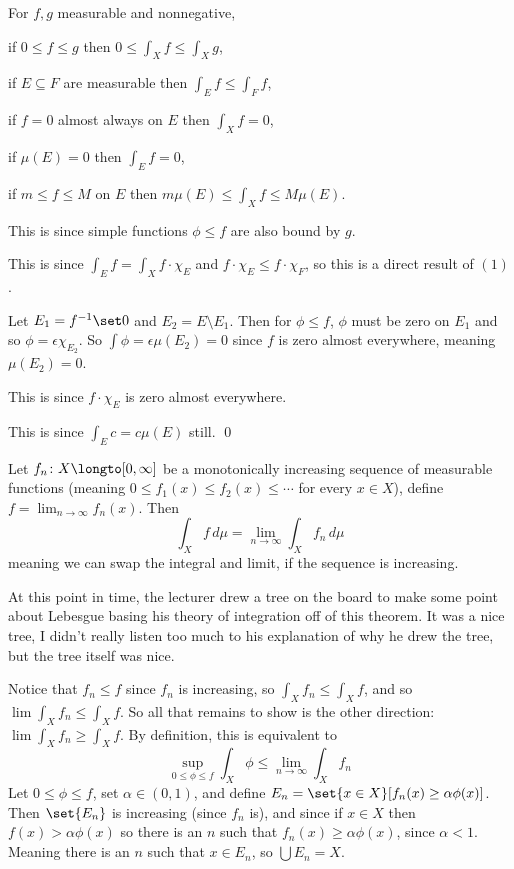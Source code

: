 \bthrm

    For $f,g$ measurable and nonnegative,
    \benum
        \item if $0\leq f\leq g$ then $0\leq\int_Xf\leq\int_Xg$,
        \item if $E\subseteq F$ are measurable then $\int_Ef\leq\int_Ff$,
        \item if $f=0$ almost always on $E$ then $\int_Xf=0$,
        \item if $\mu(E)=0$ then $\int_Ef=0$,
        \item if $m\leq f\leq M$ on $E$ then $m\mu(E)\leq\int_Xf\leq M\mu(E)$.
    \eenum

\ethrm

\Proof\benum
    \item This is since simple functions $\phi\leq f$ are also bound by $g$.
    \item This is since $\int_Ef=\int_Xf\cdot\chi_E$ and $f\cdot\chi_E\leq f\cdot\chi_F$, so this is a direct result of $(1)$.
    \item Let $E_1=f^{-1}\set0$ and $E_2=E\setminus E_1$.
        Then for $\phi\leq f$, $\phi$ must be zero on $E_1$ and so $\phi=\epsilon\chi_{E_2}$.
        So $\int\phi=\epsilon\mu(E_2)=0$ since $f$ is zero almost everywhere, meaning $\mu(E_2)=0$.
    \item This is since $f\cdot\chi_E$ is zero almost everywhere.
    \item This is since $\int_Ec=c\mu(E)$ still.
        \qed
\eenum

\bthrm[title=The Monotone Convergence Theorem, name=monothrm]

    Let $f_n\colon X\longto[0,\infty]$ be a monotonically increasing sequence of measurable functions (meaning $0\leq f_1(x)\leq f_2(x)\leq\cdots$ for every $x\in X$), define $f=\lim_{n\to\infty}f_n(x)$.
    Then
    $$ \int_Xf\,d\mu = \lim_{n\to\infty}\int_Xf_n\,d\mu $$
    meaning we can swap the integral and limit, if the sequence is increasing.

\ethrm

At this point in time, the lecturer drew a tree on the board to make some point about Lebesgue basing his theory of integration off of this theorem.
It was a nice tree, I didn't really listen too much to his explanation of why he drew the tree, but the tree itself was nice.

\Proof Notice that $f_n\leq f$ since $f_n$ is increasing, so $\int_Xf_n\leq\int_Xf$, and so $\lim\int_Xf_n\leq\int_Xf$.
So all that remains to show is the other direction: $\lim\int_Xf_n\geq\int_Xf$.
By definition, this is equivalent to
$$ \sup_{0\leq\phi\leq f}\int_X\phi \leq \lim_{n\to\infty}\int_Xf_n $$
Let $0\leq\phi\leq f$, set $\alpha\in(0,1)$, and define $E_n=\set{x\in X}[f_n(x)\geq\alpha\phi(x)]$.
Then $\set{E_n}$ is increasing (since $f_n$ is), and since if $x\in X$ then $f(x)>\alpha\phi(x)$ so there is an $n$ such that $f_n(x)\geq\alpha\phi(x)$, since $\alpha<1$.
Meaning there is an $n$ such that $x\in E_n$, so $\bigcup E_n=X$.

